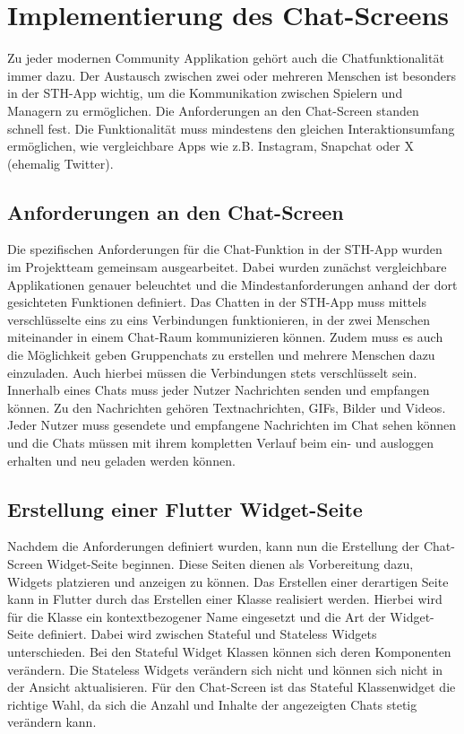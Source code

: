 \section{Implementierung des Chat-Screens}
Zu jeder modernen Community Applikation gehört auch die Chatfunktionalität immer dazu. Der Austausch zwischen zwei oder mehreren Menschen ist besonders in der STH-App wichtig, um die Kommunikation zwischen Spielern und Managern zu ermöglichen. Die Anforderungen an den Chat-Screen standen schnell fest. Die Funktionalität muss mindestens den gleichen Interaktionsumfang ermöglichen, wie vergleichbare Apps wie z.B. Instagram, Snapchat oder X (ehemalig Twitter).

\subsection{Anforderungen an den Chat-Screen}
Die spezifischen Anforderungen für die Chat-Funktion in der STH-App wurden im Projektteam gemeinsam ausgearbeitet. Dabei wurden zunächst vergleichbare Applikationen genauer beleuchtet und die Mindestanforderungen anhand der dort gesichteten Funktionen definiert. Das Chatten in der STH-App muss mittels verschlüsselte eins zu eins Verbindungen funktionieren, in der zwei Menschen miteinander in einem Chat-Raum kommunizieren können. Zudem muss es auch die Möglichkeit geben Gruppenchats zu erstellen und mehrere Menschen dazu einzuladen. Auch hierbei müssen die Verbindungen stets verschlüsselt sein. Innerhalb eines Chats muss jeder Nutzer Nachrichten senden und empfangen können. Zu den Nachrichten gehören Textnachrichten, GIFs, Bilder und Videos. Jeder Nutzer muss gesendete und empfangene Nachrichten im Chat sehen können und die Chats müssen mit ihrem kompletten Verlauf beim ein- und ausloggen erhalten und neu geladen werden können.

\subsection{Erstellung einer Flutter Widget-Seite}
Nachdem die Anforderungen definiert wurden, kann nun die Erstellung der Chat-Screen Widget-Seite beginnen. Diese Seiten dienen als Vorbereitung dazu, Widgets platzieren und anzeigen zu können. Das Erstellen einer derartigen Seite kann in Flutter durch das Erstellen einer Klasse realisiert werden. Hierbei wird für die Klasse ein kontextbezogener Name eingesetzt und die Art der Widget-Seite definiert. Dabei wird zwischen Stateful und Stateless Widgets unterschieden. Bei den Stateful Widget Klassen können sich deren Komponenten verändern. Die Stateless Widgets verändern sich nicht und können sich nicht in der Ansicht aktualisieren. Für den Chat-Screen ist das Stateful Klassenwidget die richtige Wahl, da sich die Anzahl und Inhalte der angezeigten Chats stetig verändern kann.

